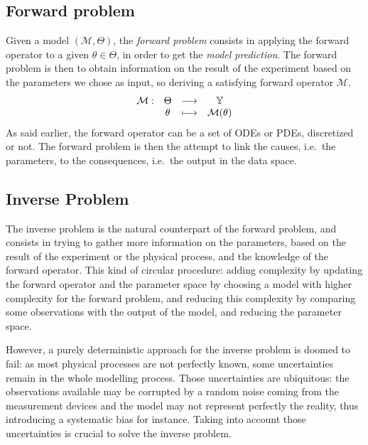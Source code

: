 \documentclass[../../Main_ManuscritThese.tex]{subfiles}
\begin{document}
\subsection{Forward problem}
Given a model $(\mathcal{M}, \Theta)$, the \emph{forward problem} consists in applying the forward operator to a given $\theta \in \Theta$, in order to get the \emph{model prediction}. The forward problem is then to obtain information on the result of the experiment based on the parameters we chose as input, so deriving a satisfying forward operator $\mathcal{M}$.
\begin{equation}
  \begin{array}{cccc}
    \mathcal{M}:& \Theta &\longrightarrow & \mathbb{Y} \\
                & \theta &\longmapsto     & \mathcal{M}(\theta)
  \end{array}
\end{equation}
As said earlier, the forward operator can be a set of ODEs or PDEs, discretized or not. The forward problem is then the attempt to link the causes, i.e.\ the parameters, to the consequences, i.e.\ the output in the data space.

\subsection{Inverse Problem}
The inverse problem is the natural counterpart of the forward problem, and consists in trying to gather more information on the parameters, based on the result of the experiment or the physical process, and the knowledge of the forward operator. This kind of circular procedure: adding complexity by updating the forward operator and the parameter space by choosing a model with higher complexity for the forward problem, and reducing this complexity by comparing some observations with the output of the model, and reducing the parameter space. 

However, a purely deterministic approach for the inverse problem is doomed to fail: as most physical processes are not perfectly known, some uncertainties remain in the whole modelling process. Those uncertainties are ubiquitous: the observations available may be corrupted by a random noise coming from the measurement devices and the model may not represent perfectly the reality, thus introducing a systematic bias for instance. Taking into account those uncertainties is crucial to solve the inverse problem.

\end{document}
